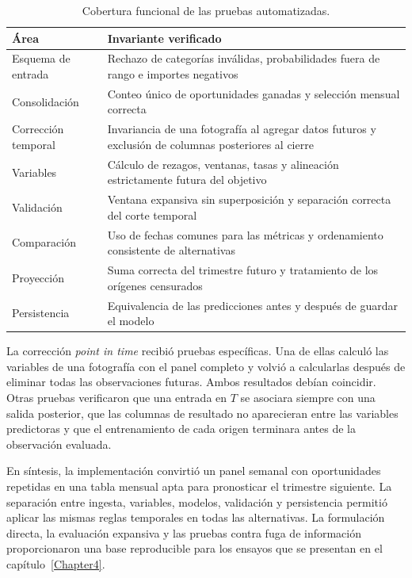 \begin{table}[ht]
    \centering
    \caption{Cobertura funcional de las pruebas automatizadas.}
    \label{tab:pruebasImplementacion}
    \small
    \begin{tabular}{p{3.5cm} p{8.4cm}}
        \toprule
        Área & Invariante verificado \\
        \midrule
        Esquema de entrada & Rechazo de categorías inválidas, probabilidades fuera de rango e importes negativos \\
        Consolidación & Conteo único de oportunidades ganadas y selección mensual correcta \\
        Corrección temporal & Invariancia de una fotografía al agregar datos futuros y exclusión de columnas posteriores al cierre \\
        Variables & Cálculo de rezagos, ventanas, tasas y alineación estrictamente futura del objetivo \\
        Validación & Ventana expansiva sin superposición y separación correcta del corte temporal \\
        Comparación & Uso de fechas comunes para las métricas y ordenamiento consistente de alternativas \\
        Proyección & Suma correcta del trimestre futuro y tratamiento de los orígenes censurados \\
        Persistencia & Equivalencia de las predicciones antes y después de guardar el modelo \\
        \bottomrule
    \end{tabular}
\end{table}

La corrección \textit{point in time} recibió pruebas específicas. Una de ellas calculó las variables de una fotografía con el panel completo y volvió a calcularlas después de eliminar todas las observaciones futuras. Ambos resultados debían coincidir. Otras pruebas verificaron que una entrada en $T$ se asociara siempre con una salida posterior, que las columnas de resultado no aparecieran entre las variables predictoras y que el entrenamiento de cada origen terminara antes de la observación evaluada.

En síntesis, la implementación convirtió un panel semanal con oportunidades repetidas en una tabla mensual apta para pronosticar el trimestre siguiente. La separación entre ingesta, variables, modelos, validación y persistencia permitió aplicar las mismas reglas temporales en todas las alternativas. La formulación directa, la evaluación expansiva y las pruebas contra fuga de información proporcionaron una base reproducible para los ensayos que se presentan en el capítulo~\ref{Chapter4}.
